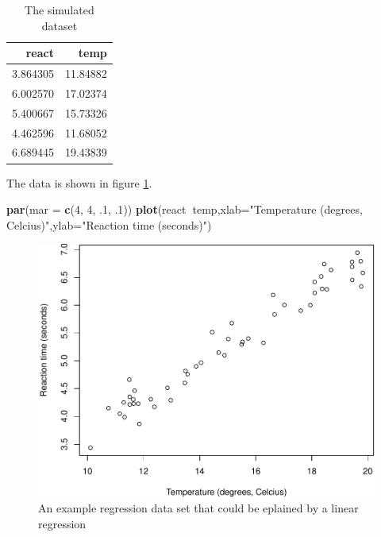 \documentclass[
]{book}
\newenvironment{Shaded}{\begin{snugshade}}{\end{snugshade}}
\newcommand{\DataTypeTok}[1]{\textcolor[rgb]{0.13,0.29,0.53}{#1}}
\newcommand{\DecValTok}[1]{\textcolor[rgb]{0.00,0.00,0.81}{#1}}
\newcommand{\FloatTok}[1]{\textcolor[rgb]{0.00,0.00,0.81}{#1}}
\newcommand{\KeywordTok}[1]{\textcolor[rgb]{0.13,0.29,0.53}{\textbf{#1}}}
\newcommand{\NormalTok}[1]{#1}
\newcommand{\OperatorTok}[1]{\textcolor[rgb]{0.81,0.36,0.00}{\textbf{#1}}}
\newcommand{\StringTok}[1]{\textcolor[rgb]{0.31,0.60,0.02}{#1}}
\begin{document}
\begin{table}

\caption{\label{tab:Ttab1}The simulated dataset}
\centering
\begin{tabular}[t]{rr}
\toprule
react & temp\\
\midrule
3.864305 & 11.84882\\
6.002570 & 17.02374\\
5.400667 & 15.73326\\
4.462596 & 11.68052\\
6.689445 & 19.43839\\
\bottomrule
\end{tabular}
\end{table}

The data is shown in figure \ref{fig:Freg}.

\begin{Shaded}
\begin{Highlighting}[]
\KeywordTok{par}\NormalTok{(}\DataTypeTok{mar =} \KeywordTok{c}\NormalTok{(}\DecValTok{4}\NormalTok{, }\DecValTok{4}\NormalTok{, }\FloatTok{.1}\NormalTok{, }\FloatTok{.1}\NormalTok{))}
\KeywordTok{plot}\NormalTok{(react}\OperatorTok{~}\NormalTok{temp,}\DataTypeTok{xlab=}\StringTok{"Temperature (degrees, Celcius)"}\NormalTok{,}\DataTypeTok{ylab=}\StringTok{"Reaction time (seconds)"}\NormalTok{)}
\end{Highlighting}
\end{Shaded}

\begin{figure}

{\centering \includegraphics[width=0.8\linewidth]{ECOMODbook_files/figure-latex/Freg-1} 

}

\caption{An example regression data set that could be eplained by a linear regression}\label{fig:Freg}
\end{figure}
\end{document}
